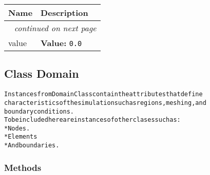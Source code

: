    \vspace{-1cm}
\hspace{\varindent}\begin{longtable}{|p{\varnamewidth}|p{\vardescrwidth}|l}
\cline{1-2}
\cline{1-2} \centering \textbf{Name} & \centering \textbf{Description}& \\
\cline{1-2}
\endhead\cline{1-2}\multicolumn{3}{r}{\small\textit{continued on next page}}\\\endfoot\cline{1-2}
\endlastfoot\raggedright v\-a\-l\-u\-e\- & \raggedright \textbf{Value:} 
{\tt 0.0}&\\
\cline{1-2}
\end{longtable}



\subsection{Class Domain}

    \label{Classes:Domain}
\begin{alltt}

Instances from Domain Class contain the attributes that define 
characteristics of the simulation such as regions, meshing, and 
boundary conditions.
To be included here are instances of other clases such as:
    * Nodes.
    * Elements 
    * And boundaries.
\end{alltt}



  \subsubsection{Methods}

    \label{Classes:Domain:__init_}

    \vspace{0.5ex}

